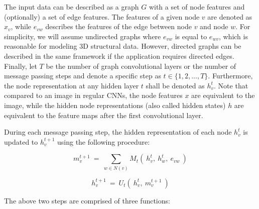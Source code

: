 The input data can be described as a graph $G$ with	a set of node features and (optionally) a set of edge features. The features of a given node $v$ are denoted as $x_v$, while $e_{vw}$ describes the features of the edge between node $v$ and node $w$. For simplicity, we will assume undirected graphs where $e_{vw}$ is equal to $e_{wv}$, which is reasonable for modeling 3D structural data. However, directed graphs can be described in the same framework if the application requires directed edges. Finally, let $T$ be the number of graph convolutional layers or the number of message passing steps and denote a specific step as $t \in \{1, 2, ..., T\}$. Furthermore, the node representation at any hidden layer $t$ shall be denoted as $h_v^t$. Note that compared to an image in regular CNNs, the node features $x$ are equivalent to the image, while the hidden node representations (also called hidden states) $h$ are equivalent to the feature maps after the first convolutional layer.

During each message passing step, the hidden representation of each node $h_v^t$ is updated to $h_v^{t+1}$ using the following procedure:

\begin{equation}\label{eq:message-function}
m_v^{t+1} ~=~ \sum_{w \in N(v)} M_t(~h_v^t,~ h_w^t,~ e_{vw}~)
\end{equation}

\begin{equation}\label{eq:update-function}
h_v^{t+1} ~=~ U_t(~h_v^t, ~m_v^{t+1}~)
\end{equation}


The above two steps are comprised of three functions:

